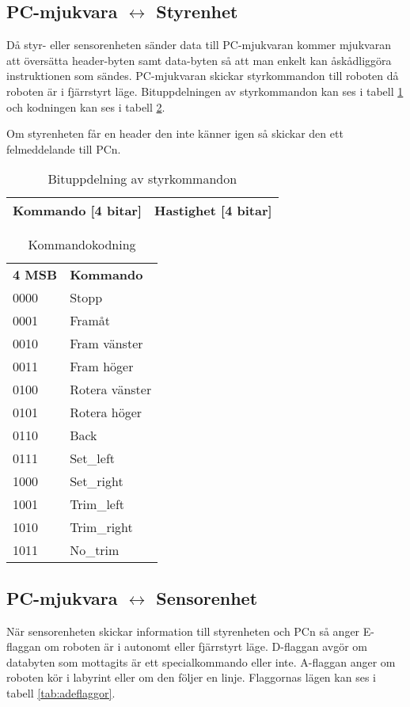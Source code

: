 \subsection{PC-mjukvara $\longleftrightarrow$ Styrenhet}
Då styr- eller sensorenheten sänder data till PC-mjukvaran kommer mjukvaran att
översätta header-byten samt data-byten så att man enkelt kan åskådliggöra
instruktionen som sändes. 
PC-mjukvaran skickar styrkommandon till roboten då roboten är i fjärrstyrt läge.
Bituppdelningen av styrkommandon kan ses i tabell \ref{tab:styrbitar} och
kodningen kan ses i tabell \ref{tab:styrkommando}.

Om styrenheten får en header den inte känner igen så skickar den ett
felmeddelande till PCn.

\begin{table}[h] 
  \centering
  \begin{tabular}{| c | c |}
    \hline
    Kommando [4 bitar] & Hastighet [4 bitar] \\ \hline
  \end{tabular}
  \caption{Bituppdelning av styrkommandon}
  \label{tab:styrbitar}
\end{table}

\begin{table}[h] 
  \centering
  \begin{tabular}{l l}
    \textbf{4 MSB} & \textbf{Kommando} \\
    0000 & Stopp \\
    0001 & Framåt \\
    0010 & Fram vänster \\
    0011 & Fram höger \\
    0100 & Rotera vänster \\
    0101 & Rotera höger \\
    0110 & Back \\
    0111 & Set_left \\
    1000 & Set_right \\
    1001 & Trim_left \\
    1010 & Trim_right \\
    1011 & No_trim \\
  \end{tabular}
  \caption{Kommandokodning}
  \label{tab:styrkommando}
\end{table}


\subsection{PC-mjukvara $\longleftrightarrow$ Sensorenhet}
När sensorenheten skickar information till styrenheten och PCn 
så anger E-flaggan om roboten är i autonomt eller fjärrstyrt läge.
D-flaggan avgör om databyten som mottagits är ett specialkommando eller inte.
A-flaggan anger om roboten kör i labyrint eller om den följer en linje.
Flaggornas lägen kan ses i tabell \ref{tab:adeflaggor}.


